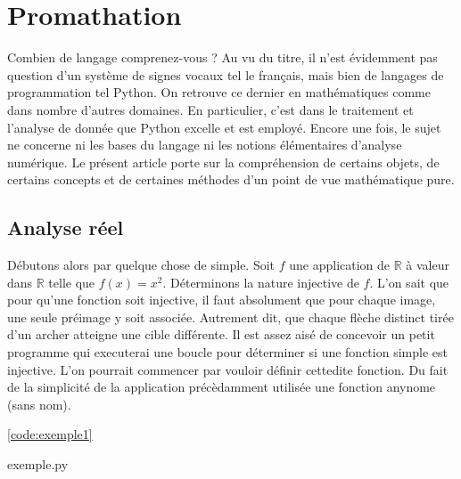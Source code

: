 \documentclass[9pt,french, babel,twocolumn]{extarticle}
\newcommand{\real}{\mathbb{R}}
\begin{document}
	\section*{Promathation}
	Combien de langage comprenez-vous ? Au vu du titre, il n'est évidemment pas question d'un système de signes vocaux tel le français, mais bien de langages de programmation tel Python. On retrouve ce dernier en mathématiques comme dans nombre d'autres domaines. En particulier, c'est dans le traitement et l'analyse de donnée que Python excelle et est employé. Encore une fois, le sujet ne concerne ni les bases du langage ni les notions élémentaires d'analyse numérique. Le présent article porte sur la compréhension de certains objets, de certains concepts et de certaines méthodes d'un point de vue mathématique pure. 
	\subsection*{Analyse réel}
		Débutons alors par quelque chose de simple. Soit \(f\) une application de \(\real\) à valeur dans \(\real\) telle que \(f(x)=x^2\). Déterminons la nature injective de \(f\). L'on sait que pour qu'une fonction soit injective, il faut absolument que pour chaque image, une seule préimage y soit associée. Autrement dit, que chaque flèche distinct tirée d'un archer atteigne une cible différente. Il est assez aisé de concevoir un petit programme qui executerai une boucle pour déterminer si une fonction simple est injective. L'on pourrait commencer par vouloir définir cettedite fonction. Du fait de la simplicité de la application précèdamment utilisée une fonction anynome (sans nom). 
			\begin{Code}\ref{code:exemple1}
				
				\caption{exemple.py}
			\end{Code}
\end{document}
